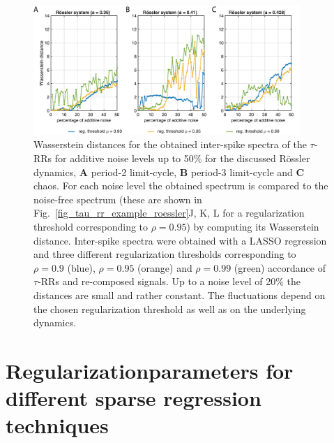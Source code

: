 \documentclass[entropy,article,submit,pdftex,moreauthors]{Definitions/mdpi}
\begin{document}
\begin{figure}[h!]
 \centering
 \includegraphics[width=0.9\textwidth]{./figures/fig_roessler_spectra_distances}
 \caption{Wasserstein distances for the obtained inter-spike spectra of the $\tau$-RRs for additive noise levels up to 50\% for the discussed R\"ossler dynamics, 
 \textbf{A} period-2 limit-cycle, \textbf{B} period-3 limit-cycle and \textbf{C} chaos. For each noise level the obtained spectrum is compared to the noise-free spectrum (these are shown 
 in Fig.~\ref{fig_tau_rr_example_roessler}J, K, L for a regularization threshold corresponding to $\rho=0.95$) by computing its Wasserstein distance. Inter-spike spectra were obtained with a 
 LASSO regression and three different regularization thresholds corresponding to $\rho=0.9$ (blue), $\rho=0.95$ (orange) and $\rho=0.99$ (green) accordance of $\tau$-RRs and re-composed signals. 
 Up to a noise level of 20\% the distances are small and rather constant. The fluctuations depend on the chosen regularization threshold as well as on the underlying dynamics.}
\label{fig_roessler_spectra_distances}
\end{figure}

\section{Regularizationparameters for different sparse regression techniques}\label{sec_regularization_appendix}
\end{document}
